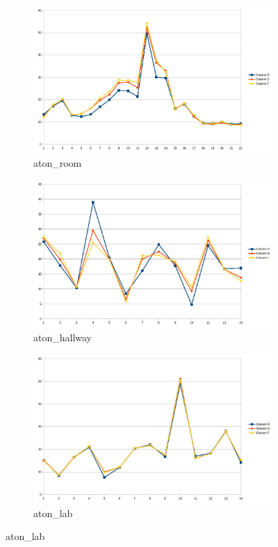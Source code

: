 \documentclass[12pt]{report}
\begin{document}
\begin{figure}
  \centering
  \begin{subfigure}{.49\linewidth}
  \includegraphics[width=1\linewidth]{figures/rgshift_room.jpg}
  \caption{aton\_room}
\end{subfigure}
\hfill
\begin{subfigure}{.49\linewidth}
  \includegraphics[width=1\linewidth]{figures/rgshift_hallway.jpg}
  \caption{aton\_hallway}
\end{subfigure}
\hfill
\begin{subfigure}{.7\linewidth}
  \includegraphics[width=1\linewidth]{figures/rgshift_lab.jpg}
  \caption{aton\_lab}
\end{subfigure}


\end{figure}
\end{document}
